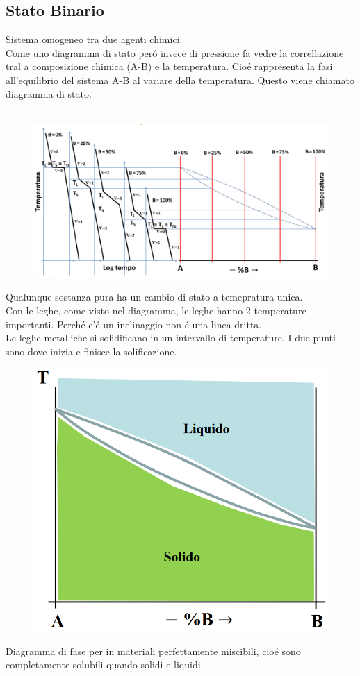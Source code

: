 \documentclass{article}
\begin{document}
{        \subsection{Stato Binario}
            Sistema omogeneo tra due agenti chimici.\\
            Come uno diagramma di stato per\'o invece di pressione fa vedre la correllazione tral a composizione chimica (A-B) e la temperatura. Cio\'e rappresenta la fasi all'equilibrio del sistema A-B al variare della temperatura. Questo viene chiamato diagramma di stato.\\ \\
           \begin{figure}[ht]
                \centering
                \includegraphics[width=.85\linewidth]{Cambio nella curva di raffreddamento in un sistema completamente miscibilie esemplare.png}
            \end{figure}
            Qualunque sostanza pura ha un cambio di stato a temepratura unica.\\
            Con le leghe, come visto nel diagramma, le leghe hanno 2 temperature importanti. Perch\'e c'\'e un inclinaggio non \'e una linea dritta.\\
            Le leghe metalliche si solidificano in un intervallo di temperature. I due punti sono dove inizia e finisce la solificazione.
            \begin{figure}[!h]
                \centering
                \includegraphics[width=.85\linewidth]{Zone di stato in un diagramma di stato per due leghe compleamente miscibili.png}
            \end{figure}
            Diagramma di fase per in materiali perfettamente miscibili, cio\'e sono completamente solubili quando solidi e liquidi.
}
\end{document}
